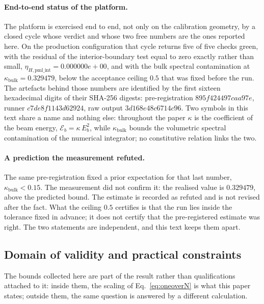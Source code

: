 \documentclass[aps,prd,reprint,superscriptaddress,nofootinbib,floatfix]{revtex4-2}
\begin{document}
\paragraph{End-to-end status of the platform.} The platform is exercised end
to end, not only on the calibration geometry, by a closed cycle whose verdict
and whose two free numbers are the ones reported here. On the production
configuration that cycle returns five of five checks green, with the residual
of the interior-boundary test equal to zero exactly rather than small,
\(\eta_{H,\text{pml\_int}}=0.000000e+00\), and with the bulk spectral
contamination at \(\kappa_{\mathrm{bulk}}=0.329479\), below the acceptance
ceiling \(0.5\) that was fixed before the run. The artefacts behind those
numbers are identified by the first sixteen hexadecimal digits of their
SHA-256 digests: pre-registration \(895f424497caa97e\), runner
\(c7de8f1143d62924\), raw output \(3d168e48c6714c96\).
Two symbols in this text share a name and nothing else: throughout the
paper \(\kappa\) is the coefficient of the beam energy,
\(\mathcal{E}_b=\kappa\,E_b^{2}\), while \(\kappa_{\mathrm{bulk}}\) bounds
the volumetric spectral contamination of the numerical integrator; no
constitutive relation links the two.

\paragraph{A prediction the measurement refuted.} The same pre-registration
fixed a prior expectation for that last number,
\(\kappa_{\mathrm{bulk}}<0.15\). The measurement did not confirm it: the
realised value is \(0.329479\), above the predicted bound. The estimate is
recorded as refuted and is not revised after the fact. What the ceiling
\(0.5\) certifies is that the run lies inside the tolerance fixed in advance;
it does not certify that the pre-registered estimate was right. The two
statements are independent, and this text keeps them apart.

\subsection{Domain of validity and practical constraints}

The bounds collected here are part of the result rather than qualifications
attached to it: inside them, the scaling of Eq.~\eqref{eq:oneoverN} is what
this paper states; outside them, the same question is answered by a different
calculation.
\end{document}
